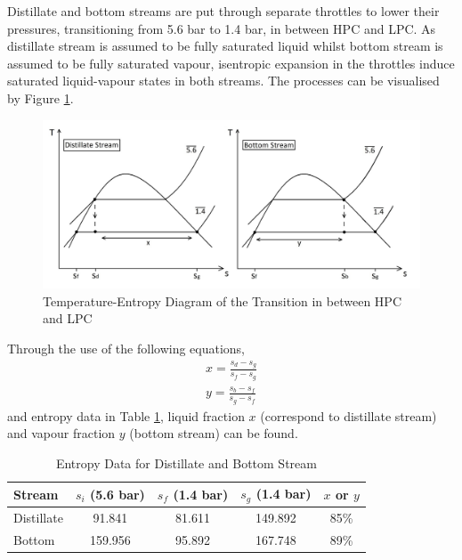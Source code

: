         Distillate and bottom streams are put through separate throttles to lower their pressures, transitioning from 5.6 bar to 1.4 bar, in between HPC and LPC. As distillate stream is assumed to be fully saturated liquid whilst bottom stream is assumed to be fully saturated vapour, isentropic expansion in the throttles induce saturated liquid-vapour states in both streams. The processes can be visualised by Figure \ref{transition_T-S_diagram}. \\
        \begin{figure}[H]
            \centering
	        \includegraphics[width=1.00\linewidth]{airseparation/graphics/transition_T-S_diagram.jpg}
	        \caption{Temperature-Entropy Diagram of the Transition in between HPC and LPC}
	        \label{transition_T-S_diagram}
        \end{figure} 
        \noindent Through the use of the following equations,
        \begin{equation}
            \begin{aligned}
                x = \frac{s_d-s_g}{s_f-s_g} \\
                y = \frac{s_b-s_f}{s_g-s_f}
            \end{aligned}
            \label{eq:transition_xy}
        \end{equation}
        and entropy data in Table \ref{table:transition_entropy}, liquid fraction $x$ (correspond to distillate stream) and vapour fraction $y$ (bottom stream) can be found. \\
        \begin{table}[H]
        \centering
            \singlespacing
	        \caption{Entropy Data for Distillate and Bottom Stream}
	        \label{table:transition_entropy}
	
	        \begin{tabular}{|l|c|cc|c|}
	        \hline
	        Stream      	& $s_i$ (5.6 bar)   & $s_f$ (1.4 bar)   & $s_g$ (1.4 bar)   & $x$ or $y$     \\
	        \hline
	        Distillate		& 91.841			& 81.611            & 149.892           & 85\% \\
	        Bottom			& 159.956   	    & 95.892            & 167.748           & 89\% \\
	        \hline
	        \end{tabular}
        \end{table}
